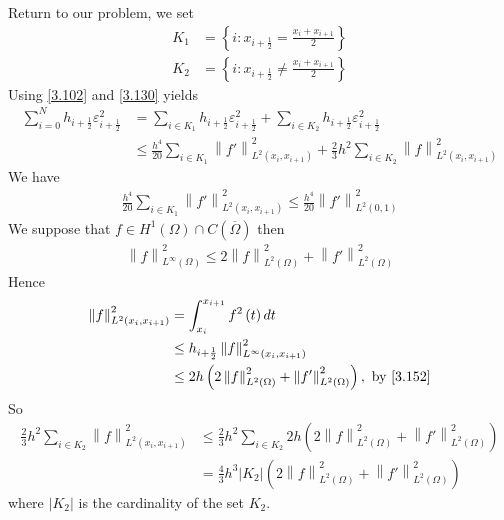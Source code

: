\documentclass[a4paper]{article}
\numberwithin{equation}{section}
\begin{document}
Return to our problem, we set
\begin{align}
{K_1} &= \left\{ {i:{x_{i + \frac{1}{2}}} = \frac{{{x_i} + {x_{i + 1}}}}{2}} \right\}\\
{K_2} &= \left\{ {i:{x_{i + \frac{1}{2}}} \ne \frac{{{x_i} + {x_{i + 1}}}}{2}} \right\}
\end{align}
Using \eqref{3.102} and \eqref{3.130} yields
\begin{align}
\sum\limits_{i = 0}^N {{h_{i + \frac{1}{2}}}\varepsilon _{i + \frac{1}{2}}^2}  &= \sum\limits_{i \in {K_1}} {{h_{i + \frac{1}{2}}}\varepsilon _{i + \frac{1}{2}}^2}  + \sum\limits_{i \in {K_2}} {{h_{i + \frac{1}{2}}}\varepsilon _{i + \frac{1}{2}}^2} \\
& \le \frac{{{h^4}}}{{20}}\sum\limits_{i \in {K_1}} {\left\| {f'} \right\|_{{L^2}\left( {{x_i},{x_{i + 1}}} \right)}^2}  + \frac{2}{3}{h^2}\sum\limits_{i \in {K_2}} {\left\| f \right\|_{{L^2}\left( {{x_i},{x_{i + 1}}} \right)}^2} 
\end{align}
We have
\begin{align}
\label{3.151}
\frac{{{h^4}}}{{20}}\sum\limits_{i \in {K_1}} {\left\| {f'} \right\|_{{L^2}\left( {{x_i},{x_{i + 1}}} \right)}^2}  \le \frac{{{h^4}}}{{20}}\left\| {f'} \right\|_{{L^2}\left( {0,1} \right)}^2
\end{align}
We suppose that $f \in {H^1}\left( \Omega  \right) \cap C\left( {\overline \Omega  } \right)$ then
\begin{align}
\label{3.152}
\left\| f \right\|_{{L^\infty }\left( \Omega  \right)}^2 \le 2\left\| f \right\|_{{L^2}\left( \Omega  \right)}^2 + \left\| {f'} \right\|_{{L^2}\left( \Omega  \right)}^2
\end{align}
Hence
\begin{align}
\left\| f \right\|_{{L^2}\left( {{x_i},{x_{i + 1}}} \right)}^2 &= \int_{{x_i}}^{{x_{i + 1}}} {{f^2}\left( t \right)dt} \\
& \le {h_{i + \frac{1}{2}}}\left\| f \right\|_{{L^\infty }\left( {{x_i},{x_{i + 1}}} \right)}^2\\
& \le 2h\left( {2\left\| f \right\|_{{L^2}\left( \Omega  \right)}^2 + \left\| {f'} \right\|_{{L^2}\left( \Omega  \right)}^2} \right),\mbox{ by \eqref{3.152}}
\end{align}
So
\begin{align}
\label{3.156}
\frac{2}{3}{h^2}\sum\limits_{i \in {K_2}} {\left\| f \right\|_{{L^2}\left( {{x_i},{x_{i + 1}}} \right)}^2}  &\le \frac{2}{3}{h^2}\sum\limits_{i \in {K_2}} {2h\left( {2\left\| f \right\|_{{L^2}\left( \Omega  \right)}^2 + \left\| {f'} \right\|_{{L^2}\left( \Omega  \right)}^2} \right)} \\
& = \frac{4}{3}{h^3}\left| {{K_2}} \right|\left( {2\left\| f \right\|_{{L^2}\left( \Omega  \right)}^2 + \left\| {f'} \right\|_{{L^2}\left( \Omega  \right)}^2} \right)\label{3.157}
\end{align}
where $\left| {{K_2}} \right|$ is the cardinality of the set $K_2$.
\end{document}
